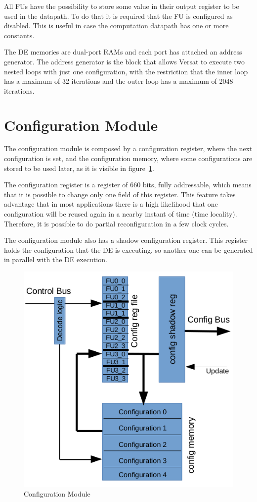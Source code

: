 All FUs have the possibility to store some value in their output
register to be used in the datapath. To do that it is required that
the FU is configured as disabled. This is useful in case the
computation datapath has one or more constants.

The DE memories are dual-port RAMs and each port has attached an
address generator. The address generator is the block that allows
Versat to execute two nested loops with just one configuration, with
the restriction that the inner loop has a maximum of 32 iterations and
the outer loop has a maximum of 2048 iterations.

\section{Configuration Module}
\label{section:configuration}

The configuration module is composed by a configuration register,
where the next configuration is set, and the configuration memory,
where some configurations are stored to be used later, as it is visible in
figure~\ref{fig_conf}.

The configuration register is a register of 660 bits, fully
addressable, which means that it is possible to change only one field
of this register. This feature takes advantage that in most
applications there is a high likelihood that one configuration will be
reused again in a nearby instant of time (time locality). Therefore,
it is possible to do partial reconfiguration in a few clock cycles.

The configuration module also has a shadow configuration
register. This register holds the configuration that the DE is
executing, so another one can be generated in parallel with the DE
execution.

\begin{figure}[!htb]
\centering
\includegraphics[width=.55\textwidth]{drawings/conf}
\caption{Configuration Module}
\label{fig_conf}
\end{figure}

